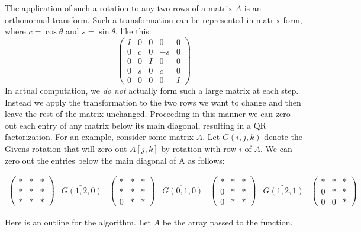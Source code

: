The application of such a rotation to any two rows of a matrix $A$ is an orthonormal transform.
Such a transformation can be represented in matrix form, where $c = \cos \theta$ and $s = \sin \theta$, like this:
\begin{equation*}
\begin{pmatrix}
I & 0 & 0 & 0 & 0 \\
0 & c & 0 & -s & 0 \\
0 & 0 & I & 0 & 0 \\
0 & s & 0 & c & 0 \\
0 & 0 & 0 & 0 & I
\end{pmatrix}
\end{equation*}
In actual computation, we \emph{do not} actually form such a large matrix at each step.
Instead we apply the transformation to the two rows we want to change and then leave the rest of the matrix unchanged.
Proceeding in this manner we can zero out each entry of any matrix below its main diagonal, resulting in a QR factorization.
For an example, consider some matrix $A$.
Let $G \left( i, j, k \right)$ denote the Givens rotation that will zero out $A \left[ j, k \right]$ by rotation with row $i$ of $A$.
We can zero out the entries below the main diagonal of A as follows:

\[
\begin{array}{ccccccc}
\begin{pmatrix}
*&*&*\\
*&*&*\\
*&*&*
\end{pmatrix}
&
\underrightarrow{G(1,2,0)}
&\begin{pmatrix}
*&*&*\\
*&*&*\\
0&*&*
\end{pmatrix}
&
\underrightarrow{G(0,1,0)}
&\begin{pmatrix}
*&*&*\\
0&*&*\\
0&*&*
\end{pmatrix}
&
\underrightarrow{G(1,2,1)}
&\begin{pmatrix}
*&*&*\\
0&*&*\\
0&0&*
\end{pmatrix}
\end{array}
\]

Here is an outline for the algorithm.
Let $A$ be the array passed to the function.

